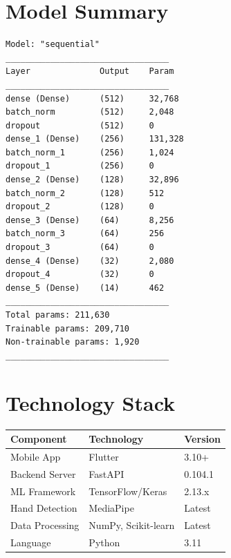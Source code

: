 \documentclass[conference]{IEEEtran}
\begin{document}

\appendix

\section{Model Summary}

\begin{verbatim}
Model: "sequential"
_________________________________
Layer              Output    Param
_________________________________
dense (Dense)      (512)     32,768    
batch_norm         (512)     2,048     
dropout            (512)     0         
dense_1 (Dense)    (256)     131,328   
batch_norm_1       (256)     1,024     
dropout_1          (256)     0         
dense_2 (Dense)    (128)     32,896    
batch_norm_2       (128)     512       
dropout_2          (128)     0         
dense_3 (Dense)    (64)      8,256     
batch_norm_3       (64)      256       
dropout_3          (64)      0         
dense_4 (Dense)    (32)      2,080     
dropout_4          (32)      0         
dense_5 (Dense)    (14)      462       
_________________________________
Total params: 211,630
Trainable params: 209,710
Non-trainable params: 1,920
_________________________________
\end{verbatim}

\section{Technology Stack}

\begin{table}[htbp]
\centering
\begin{tabular}{|l|l|l|}
\hline
\textbf{Component} & \textbf{Technology} & \textbf{Version} \\
\hline
Mobile App & Flutter & 3.10+ \\
Backend Server & FastAPI & 0.104.1 \\
ML Framework & TensorFlow/Keras & 2.13.x \\
Hand Detection & MediaPipe & Latest \\
Data Processing & NumPy, Scikit-learn & Latest \\
Language & Python & 3.11 \\
\hline
\end{tabular}
\end{table}
\end{document}
